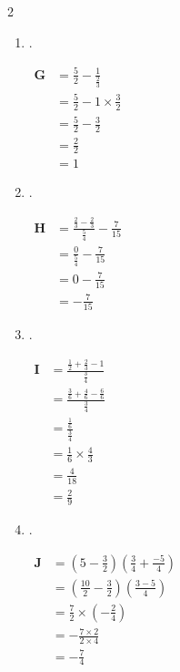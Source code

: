 \documentclass[12pt,a4paper]{article}
\begin{document}
\begin{multicols}{2}
\begin{enumerate}
\item .

$\begin{aligned}
            \textbf{G} &= \frac{5}{2}-\frac{1}{\frac{2}{3}} \\[0.8em]
            &= \frac{5}{2} - 1 \times \frac{3}{2} \\[0.5em]
            &= \frac{5}{2} - \frac{3}{2} \\[0.5em]
            &= \frac{2}{2} \\[0.5em]
            &= 1
        \end{aligned}$

\item .

$\begin{aligned}
            \textbf{H} &= \frac{\frac{2}{3}-\frac{2}{3}}{\frac{5}{4}} - \frac{7}{15} \\[0.8em]
            &= \frac{0}{\frac{5}{4}} - \frac{7}{15} \\[0.8em]
            &= 0 - \frac{7}{15} \\[0.5em]
            &= -\frac{7}{15}
        \end{aligned}$

\item .

$\begin{aligned}
            \textbf{I} &= \frac{\frac{1}{2}+\frac{2}{3}-1}{\frac{3}{4}} \\[0.8em]
            &= \frac{\frac{3}{6}+\frac{4}{6}-\frac{6}{6}}{\frac{3}{4}} \\[0.8em]
            &= \frac{\frac{1}{6}}{\frac{3}{4}} \\[0.8em]
            &= \frac{1}{6} \times \frac{4}{3} \\[0.5em]
            &= \frac{4}{18} \\[0.5em]
            &= \frac{2}{9}
        \end{aligned}$

\item .

$\begin{aligned}
            \textbf{J} &= \left(5-\frac{3}{2}\right) \left(\frac{3}{4}+\frac{-5}{4}\right) \\[0.5em]
            &= \left(\frac{10}{2}-\frac{3}{2}\right) \left(\frac{3-5}{4}\right) \\[0.5em]
            &= \frac{7}{2} \times \left(-\frac{2}{4}\right) \\[0.5em]
            &= -\frac{7 \times 2}{2 \times 4} \\[0.5em]
            &= -\frac{7}{4}
        \end{aligned}$


\end{enumerate}
\end{multicols}
\end{document}

